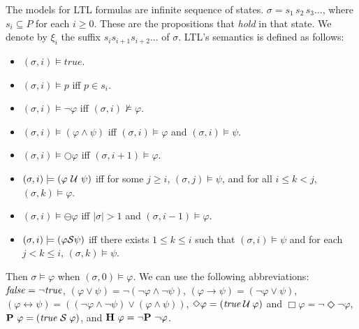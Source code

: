 The models for LTL formulas 
are infinite sequence of states.
$\sigma =  s_{1}\, s_{2}\, s_3 \ldots$,
where $s_i \subseteq P$ for each $i\geq 0$. These are the propositions that {\em hold} in that state.
We denote by $\xi_{i}$ the suffix $s_{i} s_{i+1} s_{i+2}\ldots$ of $\sigma$. 
LTL's semantics is defined as follows:
\begin{itemize}
\item $( \sigma, {i}) \models \mathit{true}$.
\item $(\sigma, {i}) \models p$ iff $p \in s_{i}$.
\item $(\sigma, {i}) \models \neg\varphi$ iff  $(\sigma, {i}) \not\models \varphi$.
\item $(\sigma, {i}) \models ( \varphi \land \psi)$ iff $(\sigma, {i}) \models \varphi$ and $(\sigma, {i} ) \models \psi$.
\item $(\sigma, {i}) \models \bigcirc \varphi$ iff $(\sigma, {i+1}) \models \varphi$.
\item $(\sigma, {i}) \models ( \varphi\ \cal{U}\ \psi )$ iff for some 
$j\geq i$, $(\sigma, {j}) \models \psi$,
and for all $i \leq k < j$, $(\sigma, {k}) \models \varphi$.
\item $(\sigma , i) \models \ominus \varphi$ iff $| \sigma | > 1$ and $(\sigma, i-1) \models \varphi$.
\item $(\sigma , i) \models (\varphi {\cal S} \psi)$ iff there exists $1 \leq k \leq i$ such that
$(\sigma , i) \models \psi$  and for each
$j < k \leq i$, 
$(\sigma , k)  \models \psi$.
\end{itemize}
Then $\sigma \models \varphi$ when $( \sigma ,0 ) \models \varphi$.
We can use the following abbreviations:
$\mathit{false} = \neg \mathit{true}$, 
$(\varphi \vee \psi) = \neg ( \neg \varphi \wedge \neg \psi )$, 
$(\varphi \rightarrow \psi) = ( \neg \varphi \vee \psi)$,
$(\varphi \leftrightarrow \psi) = ((\neg \varphi \wedge \neg \psi) \vee (\varphi \wedge \psi ))$,
$\Diamond \varphi = (\mathit{true} \mathbin{\mathcal{U}} \varphi)$ and $\Box \varphi = \neg \Diamond \neg \varphi$,
${\bf P}\  \varphi = (\mathit{true} \; {\cal S} \; \varphi)$, and 
${\bf H}\ \varphi = \neg {\bf P}\ \neg \varphi$.



